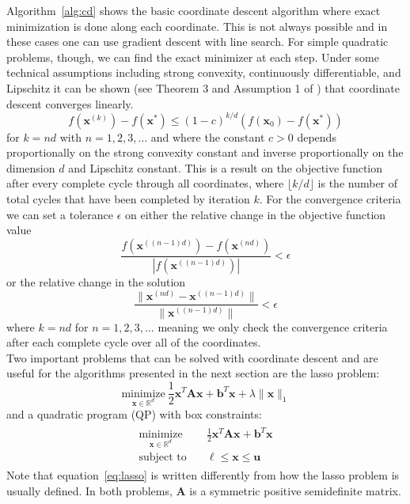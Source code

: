 \documentclass[10pt, letterpaper]{article}
\newcommand{\bx}{\boldsymbol x} %
\newcommand{\R}{\mathbb{R}} %
\begin{document}
Algorithm~\ref{alg:cd} shows the basic coordinate descent algorithm where exact minimization is done along each coordinate.  This is not always possible and in these cases one can use gradient descent with line search.  For simple quadratic problems, though, we can find the exact minimizer at each step.  Under some technical assumptions including strong convexity, continuously differentiable, and Lipschitz it can be shown (see Theorem 3 and Assumption 1 of \cite{CD}) that coordinate descent converges linearly.
\begin{equation}
f(\bx^{(k)}) - f(\bx^*) \le \left( 1 - c \right)^{k/d} \left( f(\bx_0) - f(\bx^*) \right)
\label{eq:cd_linear}
\end{equation}
for $k=nd$ with $n = 1,2,3,\ldots$ and where the constant $c > 0$ depends proportionally on the strong convexity constant and inverse proportionally on the dimension $d$ and Lipschitz constant.  This is a result on the objective function after every complete cycle through all coordinates, where $\lfloor k/d \rfloor$ is the number of total cycles that have been completed by iteration $k$.  For the convergence criteria we can set a tolerance $\epsilon$ on either the relative change in the objective function value
\[
\frac{f(\bx^{((n-1)d)}) - f(\bx^{(nd)}) }{| f(\bx^{((n-1)d)}) | } < \epsilon
\]
or the relative change in the solution
\[
\frac{\| \bx^{(nd)} - \bx^{((n-1)d)} \| }{ \| \bx^{((n-1)d)} \|} < \epsilon
\]
where $k = nd$ for $n=1,2,3,\ldots$ meaning we only check the convergence criteria after each complete cycle over all of the coordinates.\\

Two important problems that can be solved with coordinate descent and are useful for the algorithms presented in the next section are the lasso problem:
\begin{equation}
\underset{ \bx \in \R^d }{\mathrm{minimize}}\ \frac{1}{2} \bx^T {\boldsymbol A} \bx + {\boldsymbol b}^T \bx + \lambda \|\bx\|_1
\label{eq:lasso}
\end{equation}
and a quadratic program (QP) with box constraints:
\begin{align}
\begin{split}
\underset{ \bx \in \R^d }{\mathrm{minimize}}\quad &\frac{1}{2}\bx^T {\boldsymbol A} \bx + {\boldsymbol b}^T \bx \\
\text{subject to}\quad& {\boldsymbol \ell} \le \bx \le {\boldsymbol u}
\end{split}
\label{eq:box_qp}
\end{align}
Note that equation~\ref{eq:lasso} is written differently from how the lasso problem is usually defined.  In both problems, ${\boldsymbol A}$ is a symmetric positive semidefinite matrix.\\
\end{document}
